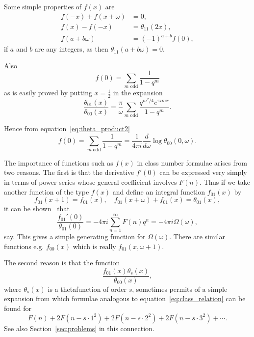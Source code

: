 \documentclass[12pt]{article}
\theoremstyle{remark}
\begin{document}
Some simple properties of $f(x)$ are
\begin{align}
f(-x) + f(x + \omega) &= 0, \label{eq:f_prop1}\\
f(x) - f(-x) &= \theta_{11}(2x), \label{eq:f_prop2}\\
f(a + b\omega) &= (-1)^{a+b} f(0), \label{eq:f_prop3}
\end{align}
if $a$ and $b$ are any integers, as then $\theta_{11}(a + b\omega) = 0$.

Also
\begin{equation}\label{eq:f_zero}
f(0) = \sum_{m \text{ odd}} \frac{1}{1 - q^m}
\end{equation}
as is easily proved by putting $x = \frac{1}{2}$ in the expansion
\begin{equation}\label{eq:f_expansion}
\frac{\theta_{01}(x)}{\theta_{00}(x)} = \frac{\pi}{\omega} \sum_{m \text{ odd}} \frac{q^{m^2/4} e^{\pi imx}}{1 - q^m}.
\end{equation}

Hence from equation~\eqref{eq:theta_product2}
\begin{equation}\label{eq:f_zero_expanded}
f(0) = \sum_{m \text{ odd}} \frac{1}{1 - q^m} = \frac{1}{4\pi i} \frac{d}{d\omega} \log \theta_{00}(0, \omega).
\end{equation}

The importance of functions such as $f(x)$ in class number formulae arises from two reasons. The first is that the derivative $f'(0)$ can be expressed very simply in terms of power series whose general coefficient involves $F(n)$. Thus if we take another function of the type $f(x)$ and define an integral function $f_{01}(x)$ by
\begin{equation}\label{eq:f01_def}
f_{01}(x + 1) = f_{01}(x), \quad f_{01}(x + \omega) + f_{01}(x) = \theta_{01}(x),
\end{equation}
it can be shown~\cite{Mordell1916} that
\begin{equation}\label{eq:f01_series}
\frac{f_{01}'(0)}{\theta_{01}(0)} = -4\pi i \sum_{n=1}^\infty F(n) q^n = -4\pi i \Omega(\omega),
\end{equation}
say. This gives a simple generating function for $\Omega(\omega)$. There are similar functions e.g. $f_{00}(x)$ which is really $f_{01}(x, \omega + 1)$.

The second reason is that the function
\begin{equation}\label{eq:ratio_function}
\frac{f_{01}(x) \theta_s(x)}{\theta_{00}(x)},
\end{equation}
where $\theta_s(x)$ is a thetafunction of order $s$, sometimes permits of a simple expansion from which formulae analogous to equation~\eqref{eq:class_relation} can be found for
\begin{equation}\label{eq:class_relation_general}
F(n) + 2F(n - s \cdot 1^2) + 2F(n - s \cdot 2^2) + 2F(n - s \cdot 3^2) + \cdots.
\end{equation}
See also Section~\ref{sec:problems} in this connection.
\end{document}
